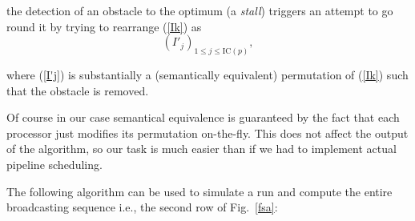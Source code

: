 \documentclass{elsart}
\begin{document}
the detection of an obstacle to the optimum (a \emph{stall\/})
triggers an attempt to go round it by trying to rearrange (\ref{Ik}) as
\begin{equation}\label{I'j}
(I'_j)_{1\leq j\leq \mathrm{IC}(p)},
\end{equation}

where (\ref{I'j}) is substantially a (semantically equivalent)
permutation of (\ref{Ik}) such that the obstacle is removed.



Of course in our case semantical equivalence is guaranteed by
the fact that each processor just modifies its permutation on-the-fly. This
does not affect the output of the algorithm, so our task is much easier
than if we had to implement actual pipeline scheduling.

The following algorithm can be used to simulate a run and compute
the entire broadcasting sequence i.e.,
the second row of Fig.~\ref{fsa}:
\end{document}
